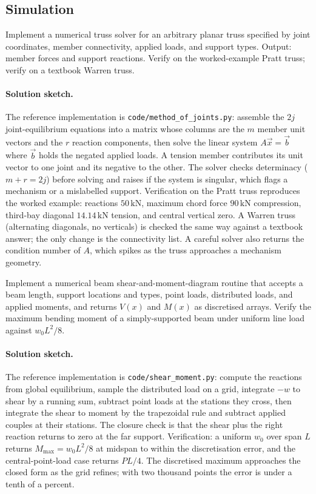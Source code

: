 \subsection*{Simulation}

\begin{exercise}
Implement a numerical truss solver for an arbitrary planar truss
specified by joint coordinates, member connectivity, applied loads,
and support types. Output: member forces and support reactions.
Verify on the worked-example Pratt truss; verify on a textbook
Warren truss.

\paragraph{Solution sketch.} The reference implementation is
\texttt{code/method\_of\_joints.py}: assemble the $2j$ joint-equilibrium
equations into a matrix whose columns are the $m$ member unit vectors and
the $r$ reaction components, then solve the linear system $A\vec{x} =
\vec{b}$ where $\vec{b}$ holds the negated applied loads. A tension
member contributes its unit vector to one joint and its negative to the
other. The solver checks determinacy ($m + r = 2j$) before solving and
raises if the system is singular, which flags a mechanism or a
mislabelled support. Verification on the Pratt truss reproduces the
worked example: reactions $50\,\text{kN}$, maximum chord force
$90\,\text{kN}$ compression, third-bay diagonal $14.14\,\text{kN}$
tension, and central vertical zero. A Warren truss (alternating
diagonals, no verticals) is checked the same way against a textbook
answer; the only change is the connectivity list. A careful solver also
returns the condition number of $A$, which spikes as the truss
approaches a mechanism geometry.
\end{exercise}

\begin{exercise}
Implement a numerical beam shear-and-moment-diagram routine that
accepts a beam length, support locations and types, point loads,
distributed loads, and applied moments, and returns $V(x)$ and
$M(x)$ as discretised arrays. Verify the maximum bending moment
of a simply-supported beam under uniform line load against $w_0 L^2
/ 8$.

\paragraph{Solution sketch.} The reference implementation is
\texttt{code/shear\_moment.py}: compute the reactions from global
equilibrium, sample the distributed load on a grid, integrate $-w$ to
shear by a running sum, subtract point loads at the stations they cross,
then integrate the shear to moment by the trapezoidal rule and subtract
applied couples at their stations. The closure check is that the shear
plus the right reaction returns to zero at the far support. Verification:
a uniform $w_0$ over span $L$ returns $M_{\max} = w_0 L^2/8$ at midspan
to within the discretisation error, and the central-point-load case
returns $PL/4$. The discretised maximum approaches the closed form as the
grid refines; with two thousand points the error is under a tenth of a
percent.
\end{exercise}

